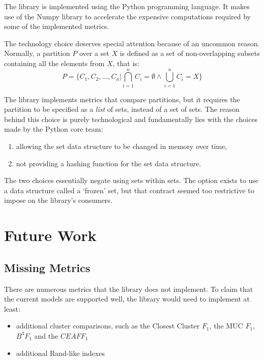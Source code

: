 \documentclass[11pt]{article}
\begin{document}
    The library is implemented using the Python programming language\cite{python}.
    It makes use of the Numpy library\cite{harris2020numpy} to accelerate
    the expensive computations required by some of the implemented metrics.

    The technology choice deserves special attention because of an uncommon
    reason.
    Normally, a partition $P$ over a set $X$ is defined as a set of
    non-overlapping subsets containing all the elements from $X$, that is:
    \[
        P = \{ C_1, C_2, \ldots, C_n | \bigcap\limits^n_{i=1}C_i=\emptyset \land \bigcup\limits^n_{i=1}C_i=X \}
    \]

    The library implements metrics that compare partitions, but it requires the
    partition to be specified as a \textit{list} of sets, instead of a set of
    sets.
    The reason behind this choice is purely technological and fundamentally lies
    with the choices made by the Python core team:
    \begin{enumerate}
        \item allowing the set data structure to be changed in memory over time,
        \item not providing a hashing function for the set data structure.
    \end{enumerate}

    The two choices essentially negate using sets within sets.
    The option exists to use a data structure called a `frozen' set, but that
    contract seemed too restrictive to impose on the library's consumers.

    \section{Future Work}\label{sec:future}

    \subsection{Missing Metrics}

    There are numerous metrics that the library does not implement\cite{hitesh2012}.
    To claim that the current models are supported well, the library would need
    to implement at least:
    \begin{itemize}
        \item additional cluster comparisons, such as the Closest Cluster $F_1$, the
        MUC $F_1$, $B^3 F_1$ and the $CEAF F_1$\cite{hitesh2012}
        \item additional Rand-like indexes\cite{warrens2022understanding}
    \end{itemize}
\end{document}

